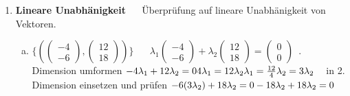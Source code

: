 \documentclass[10pt,ngerman]{scrartcl}
\begin{document}
\begin{enumerate}[1.]
	~\newline~	
	
	
\item \textbf{Lineare Unabhänigkeit}
	    ~\newline~\newline
	    Überprüfung auf lineare Unabhänigkeit von Vektoren.
	    ~\newline~
	    
	\begin{enumerate}[(a)]
	\item \begin{math}\{ ( \begin{pmatrix}-4 \\ -6\end{pmatrix},\begin{pmatrix}12 \\ 18\end{pmatrix} ) \}\end{math}
	 \newline~\newline~\newline
	\begin{math}\lambda _1 \begin{pmatrix}-4 \\ -6\end{pmatrix} + \lambda _2 \begin{pmatrix}12 \\ 18\end{pmatrix} = \begin{pmatrix}0 \\ 0\end{pmatrix} \end{math}\newline~. Dimension umformen\newline
	 \begin{math}
	-4 \lambda _1 + 12 \lambda _2 = 0 \newline
	4 \lambda _1 = 12 \lambda _2 \newline
	\lambda _1 = \frac{12}{4} \lambda _2 = 3 \lambda _2 
	\end{math}
	\newline ~ \newline
	in 2. Dimension einsetzen und prüfen\newline
	\begin{math}
	-6 (3 \lambda _2) + 18 \lambda _2 = 0  \newline
	-18 \lambda _2 + 18 \lambda _2 = 0  \newline~\newline

\end{math}
\end{enumerate}
\end{enumerate}
\end{document}
